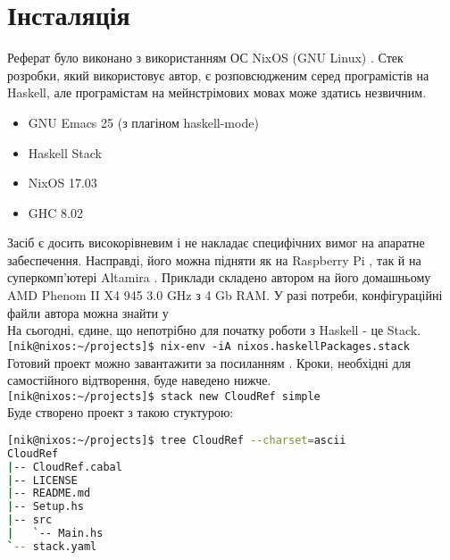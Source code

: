 \documentclass[12pt]{article}
\begin{document}
\section{Інсталяція}

Реферат було виконано з використанням ОС NixOS (GNU Linux) \cite{nixos}. Стек розробки, який використовує автор, є розповсюдженим серед програмістів на Haskell, але програмістам на мейнстрімових мовах може здатись незвичним.\\

\begin{itemize}
\item GNU Emacs 25 (з плагіном haskell-mode)
\item Haskell Stack
\item NixOS 17.03
\item GHC 8.02
\end{itemize}

Засіб є досить високорівневим і не накладає специфічних вимог на апаратне забеспечення. Насправді, його можна підняти як на Raspberry Pi \cite{cloudPi}, так й на суперкомп'ютері Altamira \cite{Altamira}. Приклади складено автором на його домашньому AMD Phenom II X4 945 3.0 GHz з 4 Gb RAM. У разі потреби, конфігураційні файли автора можна знайти у \cite{dotfiles}\\

На сьогодні, єдине, що непотрібно для початку роботи з Haskell - це Stack.\\

\lstinline{[nik@nixos:~/projects]$ nix-env -iA nixos.haskellPackages.stack}\\

Готовий проект можно завантажити за посиланням \cite{sources}. Кроки, необхідні для самостійного відтворення, буде наведено нижче.\\

\lstinline{[nik@nixos:~/projects]$ stack new CloudRef simple}\\

Буде створено проект з такою стуктурою:

\begin{lstlisting}[language=bash, caption={Структура початкового проекту}]
[nik@nixos:~/projects]$ tree CloudRef --charset=ascii
CloudRef
|-- CloudRef.cabal
|-- LICENSE
|-- README.md
|-- Setup.hs
|-- src
|   `-- Main.hs
`-- stack.yaml
\end{lstlisting}
\end{document}
